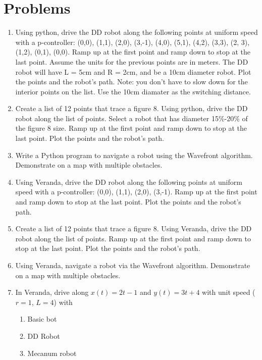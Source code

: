 \hypertarget{problems}{%
\section{Problems}\label{problems}}

\begin{enumerate}
\item
  Using python, drive the DD robot along the following points at uniform
  speed with a p-controller: (0,0), (1,1), (2,0), (3,-1), (4,0), (5,1),
  (4,2), (3,3), (2, 3), (1,2), (0,1), (0,0). Ramp up at the first point
  and ramp down to stop at the last point. Assume the units for the
  previous points are in meters. The DD robot will have L = 5cm and R =
  2cm, and be a 10cm diameter robot. Plot the points and the robot's
  path. Note: you don't have to slow down for the interior points on the
  list. Use the 10cm diamater as the switching distance.
\item
  Create a list of 12 points that trace a figure 8. Using python, drive
  the DD robot along the list of points. Select a robot that has
  diameter 15\%-20\% of the figure 8 size. Ramp up at the first point
  and ramp down to stop at the last point. Plot the points and the
  robot's path.
\item
  Write a Python program to navigate a robot using the Wavefront
  algorithm. Demonstrate on a map with multiple obstacles.
\item
  Using Veranda, drive the DD robot along the following points at
  uniform speed with a p-controller: (0,0), (1,1), (2,0), (3,-1). Ramp
  up at the first point and ramp down to stop at the last point. Plot
  the points and the robot's path.
\item
  Create a list of 12 points that trace a figure 8. Using Veranda, drive
  the DD robot along the list of points. Ramp up at the first point and
  ramp down to stop at the last point. Plot the points and the robot's
  path.
\item
  Using Veranda, navigate a robot via the Wavefront algorithm.
  Demonstrate on a map with multiple obstacles.
\item
  In Veranda, drive along \(x(t) = 2t-1\) and \(y(t) = 3t +4\) with unit
  speed (\(r=1\), \(L=4\)) with

  \begin{enumerate}
  \def\labelenumii{\alph{enumii}.}
  \tightlist
  \item
    Basic bot
  \item
    DD Robot
  \item
    Mecanum robot
  \end{enumerate}


\end{enumerate}
